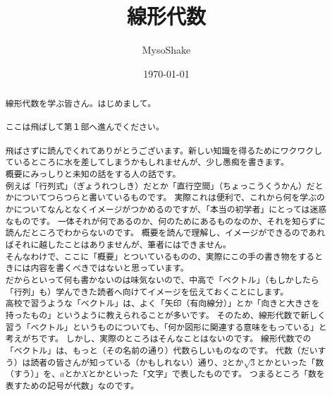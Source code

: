 \documentclass[report]{jlreq}%
\begin{document}
\author{MysoShake} 
\title{線形代数}
\date{\today}

\maketitle{}

\pagebreak{}

\begin{abstract}

線形代数を学ぶ皆さん。はじめまして。 \\
\\
\indent ここは飛ばして第１部へ進んでください。 \\
\\
\indent  飛ばさずに読んでくれてありがとうございます。新しい知識を得るためにワクワクしているところに水を差してしまうかもしれませんが、少し愚痴を書きます。\\

\indent 概要にみっしりと未知の話をする人の話です。\\

\indent  例えば「行列式」（ぎょうれつしき）だとか「直行空間」（ちょっこうくうかん）だとかについてつらつらと書いているものです。
実際これは便利で、これから何を学ぶのかについてなんとなくイメージがつかめるのですが、「本当の初学者」にとっては迷惑なものです。
一体それが何であるのか、何のためにあるものなのか、それを知らずに読んだところでわからないのです。
概要を読んで理解し、イメージができるのであればそれに越したことはありませんが、筆者にはできません。 \\

\indent そんなわけで、ここに「概要」とついているものの、実際にこの手の書き物をするときには内容を書くべきではないと思っています。\\

\indent だからといって何も書かないのは味気ないので、中高で「ベクトル」（もしかしたら「行列」も）学んできた読者へ向けてイメージを伝えておくことにします。\\

\indent 高校で習うような「ベクトル」は、よく「矢印（有向線分）」とか「向きと大きさを持ったもの」というように教えられることが多いです。
そのため、線形代数で新しく習う「ベクトル」というものについても、「何か図形に関連する意味をもっている」と考えがちです。
しかし、実際のところはそんなことはないのです。
線形代数での「ベクトル」は、もっと（その名前の通り）代数らしいものなのです。
代数（だいすう）は読者の皆さんが知っている（かもしれない）通り、$2$とか$\sqrt{3}$とかといった「数（すう）」を、$a$とか$X$とかといった「文字」で表したものです。
つまるところ「数を表すための記号が代数」なのです。
\\


\end{abstract}
\end{document}
